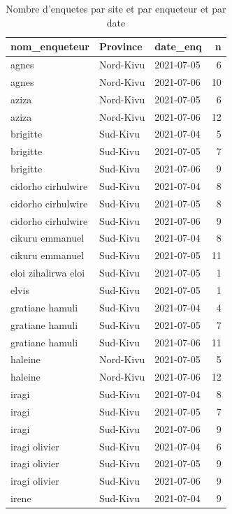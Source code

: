 \documentclass[
]{book}
\begin{document}
\begin{table}

\caption{\label{tab:unnamed-chunk-14}Nombre d'enquetes par site et par enqueteur et par date}
\centering
\begin{tabular}[t]{l|l|l|r}
\hline
nom\_enqueteur & Province & date\_enq & n\\
\hline
agnes & Nord-Kivu & 2021-07-05 & 6\\
\hline
agnes & Nord-Kivu & 2021-07-06 & 10\\
\hline
aziza & Nord-Kivu & 2021-07-05 & 6\\
\hline
aziza & Nord-Kivu & 2021-07-06 & 12\\
\hline
brigitte & Sud-Kivu & 2021-07-04 & 5\\
\hline
brigitte & Sud-Kivu & 2021-07-05 & 7\\
\hline
brigitte & Sud-Kivu & 2021-07-06 & 9\\
\hline
cidorho cirhulwire & Sud-Kivu & 2021-07-04 & 8\\
\hline
cidorho cirhulwire & Sud-Kivu & 2021-07-05 & 8\\
\hline
cidorho cirhulwire & Sud-Kivu & 2021-07-06 & 9\\
\hline
cikuru emmanuel & Sud-Kivu & 2021-07-04 & 8\\
\hline
cikuru emmanuel & Sud-Kivu & 2021-07-05 & 11\\
\hline
eloi zihalirwa eloi & Sud-Kivu & 2021-07-05 & 1\\
\hline
elvis & Sud-Kivu & 2021-07-05 & 1\\
\hline
gratiane hamuli & Sud-Kivu & 2021-07-04 & 4\\
\hline
gratiane hamuli & Sud-Kivu & 2021-07-05 & 7\\
\hline
gratiane hamuli & Sud-Kivu & 2021-07-06 & 11\\
\hline
haleine & Nord-Kivu & 2021-07-05 & 5\\
\hline
haleine & Nord-Kivu & 2021-07-06 & 12\\
\hline
iragi & Sud-Kivu & 2021-07-04 & 8\\
\hline
iragi & Sud-Kivu & 2021-07-05 & 7\\
\hline
iragi & Sud-Kivu & 2021-07-06 & 9\\
\hline
iragi olivier & Sud-Kivu & 2021-07-04 & 6\\
\hline
iragi olivier & Sud-Kivu & 2021-07-05 & 9\\
\hline
iragi olivier & Sud-Kivu & 2021-07-06 & 9\\
\hline
irene & Sud-Kivu & 2021-07-04 & 9\\

\end{tabular}
\end{table}
\end{document}
